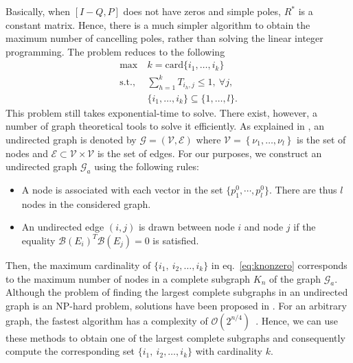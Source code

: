 \documentclass[twocolumn,12pt]{autart}
\theoremstyle{plain}
\begin{document}
Basically, when $[I-Q,P]$ does not have zeros and simple poles, $R^*$ is a constant matrix. Hence, there is a much simpler algorithm to obtain the maximum number of cancelling poles, rather than solving the linear integer programming. The problem reduces to the following
\begin{align}
\max~ &k=\text{card} \{i_1,\ldots,i_k\} \label{eq:knonzero}\\
\text{s.t.},~&\sum_{h=1}^k  T_{i_h,j} \le 1,~\forall j, \nonumber \\
& \{i_1,\ldots,i_k\}\subseteq \{1,\ldots,l\}.\nonumber
\end{align}
This problem still takes exponential-time to solve. There exist, however, a number of graph theoretical tools to solve it efficiently. As explained in \cite{GA}, an undirected graph is
denoted by $\mathcal{G}=(\mathcal{V},\mathcal{E})$
where $\mathcal{V}=\left\{\nu_{1},\ldots,\nu_{l}\right\}$ is the set
of nodes and $\mathcal{E}\subset\mathcal{V}\times\mathcal{V}$ is the set of edges. For our purposes, we construct an undirected graph $\mathcal{G}_a$ using the following rules:
\begin{itemize}
\item A node is associated with each vector in the set $\{{p}^0_1,\cdots,{p}^0_l\}$. There are thus $l$ nodes in the considered graph. \item An undirected edge $(i,j)$ is drawn between node $i$ and node $j$ if the equality $\mathcal{B}({E}_i)^T\mathcal{B}({E}_j)=0$ is satisfied.
\end{itemize}
Then, the maximum cardinality of $\{i_1,~i_2,\ldots,i_k\}$ in eq.~\eqref{eq:knonzero} corresponds to the maximum number of nodes in a complete
subgraph $K_n$ of the graph $\mathcal{G}_a$. Although the problem of finding the largest complete subgraphs in an undirected graph is an NP-hard problem, solutions have been proposed in \cite{link}. For an arbitrary graph, the fastest algorithm has a complexity of $\mathcal{O}(2^{n/4})$~\cite{rob}. Hence, we can use these methods to obtain one of the largest complete subgraphs and consequently compute the corresponding set $\{i_1,~i_2,\ldots,i_k\}$ with cardinality $k$. 
\end{document}
